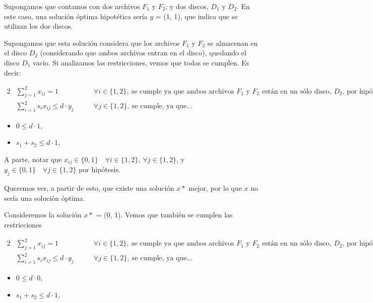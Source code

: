 \documentclass[11pt, a4paper, pdftex]{article}
\begin{document}
Supongamos que contamos con dos archivos $F_{1}$ y $F_{2}$; y dos discos, $D_{1}$ y $D_{2}$. En este caso, una solución óptima hipotética sería $y$ = (1, 1), que indica que se utilizan los dos discos.

Supongamos que esta solución considera que los archivos $F_{1}$ y $F_{2}$ se almacenan en el disco $D_{2}$ (considerando que ambos archivos entran en el disco), quedando el disco $D_{1}$ vacío. Si analizamos las restricciones, vemos que todas se cumplen. Es decir:

\begin{alignat*}{2}
    & \sum_{j = 1}^{2} x_{ij} = 1 \qquad & \forall i \in \{1, 2\},\ \text{se cumple ya que ambos archivos $F_{1}$ y $F_{2}$ están en un sólo disco, $D_{2}$, por hipótesis} \\
    & \sum_{i = 1}^{2} s_{i} x_{ij} \le d \cdot y_{j} \qquad & \forall j \in \{1, 2\},\ \text{se cumple, ya que...}
\end{alignat*}

\begin{itemize}
    \item $0 \leq d \cdot 1$, 
    \item $s_{1} + s_{2} \leq d \cdot 1$, 
\end{itemize}

A parte, notar que $x_{ij} \in \{0,1\} \quad \forall i \in \{1, 2\}, \ \forall j \in \{1, 2\}$, y $y_{j} \in \{0,1\} \quad \forall j \in \{1, 2\}$ por hipótesis. %

Queremos ver, a partir de esto, que existe una solución $x*$ mejor, por lo que $x$ no sería una solución óptima.

Consideremos la solución $x*$ = (0, 1). Vemos que también se cumplen las restricciones

\begin{alignat*}{2}
    & \sum_{j = 1}^{2} x_{ij} = 1 \qquad & \forall i \in \{1, 2\},\ \text{se cumple ya que ambos archivos $F_{1}$ y $F_{2}$ están en un sólo disco, $D_{2}$, por hipótesis} \\
    & \sum_{i = 1}^{2} s_{i} x_{ij} \le d \cdot y_{j} \qquad & \forall j \in \{1, 2\},\ \text{se cumple, ya que...}
\end{alignat*}

\begin{itemize}
    \item $0 \leq d \cdot 0$, 
    \item $s_{1} + s_{2} \leq d \cdot 1$, 
\end{itemize}
\end{document}
